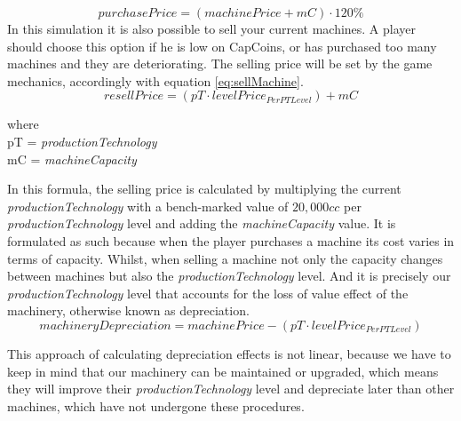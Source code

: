 \begin{equation}
purchasePrice=(machinePrice+mC)\cdot 120\%
\label{eq:buyMachine}
\end{equation}
In this simulation it is also possible to sell your current machines. A player should choose this option if he is low on CapCoins, or has purchased too many machines and they are deteriorating. The selling price will be set by the game mechanics, accordingly with equation \ref{eq:sellMachine}.
\begin{equation}
resellPrice=(pT \cdot levelPrice_{PerPTLevel})+mC
\label{eq:sellMachine}
\end{equation}
\begin{center}
	where\\
	pT = \textit{productionTechnology} \\
	mC = \textit{machineCapacity}
\end{center}
In this formula, the selling price is calculated by multiplying the current \textit{productionTechnology} with a bench-marked value of $20,000cc$ per \textit{productionTechnology} level and adding the \textit{machineCapacity} value. It is formulated as such because when the player purchases a machine its cost varies in terms of capacity. Whilst, when selling a machine not only the capacity changes between machines but also the \textit{productionTechnology} level. And it is precisely our \textit{productionTechnology} level that accounts for the loss of value effect of the machinery, otherwise known as depreciation. 
\begin{equation}
machineryDepreciation= machinePrice - (pT \cdot levelPrice_{PerPTLevel})
    \label{eq:machineDepreciation}
\end{equation}

This approach of calculating depreciation effects is not linear, because we have to keep in mind that our machinery can be maintained or upgraded, which means they will improve their \textit{productionTechnology} level and depreciate later than other machines, which have not undergone these procedures.

